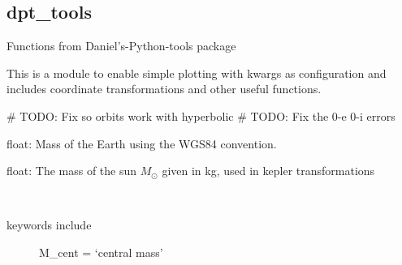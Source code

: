 \documentclass[letterpaper,10pt,english]{sphinxmanual}
\begin{document}
\subsection{dpt\_tools}
\label{\detokenize{modules/dpt_tools:module-dpt_tools}}\label{\detokenize{modules/dpt_tools:dpt-tools}}\label{\detokenize{modules/dpt_tools::doc}}
Functions from Daniel’s-Python-tools package

This is a module to enable simple plotting with kwargs as
configuration and includes coordinate transformations and other useful functions.

\# TODO: Fix so orbits work with hyperbolic
\# TODO: Fix the 0-e 0-i errors

\begin{fulllineitems}
\label{\detokenize{modules/dpt_tools:dpt_tools.M_earth}}
float: Mass of the Earth using the WGS84 convention.

\end{fulllineitems}


\begin{fulllineitems}
\label{\detokenize{modules/dpt_tools:dpt_tools.M_sol}}
float: The mass of the sun \(M_\odot\) given in kg, used in kepler transformations

\end{fulllineitems}


\begin{fulllineitems}
\label{\detokenize{modules/dpt_tools:dpt_tools.ascending_node_from_statevector}}~\begin{description}
\item[{keywords include}] \leavevmode
M\_cent = ‘central mass’

\end{description}

\end{fulllineitems}
\end{document}
